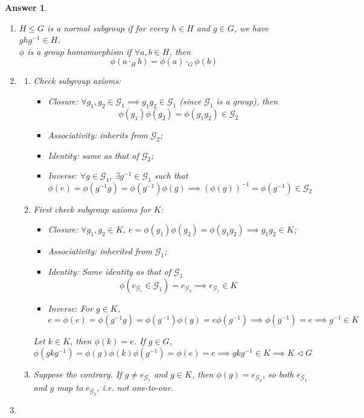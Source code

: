 \documentclass[a4paper]{article}
\newtheorem{ans}{Answer}[section]
\theoremstyle{new}
\begin{document}
\begin{ans}\leavevmode
\begin{enumerate}[label=(\roman*)]
\item $H\leq G$ is a normal subgroup if for every $h\in H$ and $g\in G$, we have $ghg^{-1}\in H$.\\[5pt]
$\phi$ is a group homomorphism if $\forall a,b\in H$, then
$$\phi(a\cdot_H b)=\phi(a)\cdot_G\phi(b)$$
\item 
\begin{enumerate}[label=(\alph*)]
\item Check subgroup axioms:
\begin{itemize}
    \item Closure: $\forall g_1,g_2\in \mathcal{G}_1\implies g_1g_2\in\mathcal{G}_1$ (since $\mathcal{G}_1$ is a group), then $$\phi(g_1)\phi(g_2)=\phi(g_1g_2)\in \mathcal{G}_2$$
    \item Associativity: inherits from $\mathcal{G}_2$;
    \item Identity: same as that of $\mathcal{G}_2$;
    \item Inverse: $\forall g\in\mathcal{G}_1$, $\exists g^{-1}\in\mathcal{G}_1$ such that
    $$\phi(e)=\phi(g^{-1}g)=\phi(g^{-1})\phi(g)\implies(\phi(g))^{-1}=\phi(g^{-1})\in\mathcal{G}_2$$
\end{itemize}
\item First check subgroup axioms for $K$:
\begin{itemize}
    \item Closure: $\forall g_1,g_2\in K$, $e=\phi(g_1)\phi(g_2)=\phi(g_1g_2)\implies g_1g_2\in K$;
    \item Associativity: inherited from $\mathcal{G}_1$;
    \item Identity: Same identity as that of $\mathcal{G}_1$ $$\phi(e_{\mathcal{G}_1}\in\mathcal{G}_1)=e_{\mathcal{G}_2}\implies e_{\mathcal{G}_1}\in K$$
    \item Inverse: For $g\in K$,
    $$e=\phi(e)=\phi(g^{-1}g)=\phi(g^{-1})\phi(g)=e\phi(g^{-1})\implies\phi(g^{-1})=e\implies g^{-1}\in K$$
\end{itemize}
Let $k\in K$, then $\phi(k)=e$. If $g\in G$,
$$\phi(gkg^{-1})=\phi(g)\phi(k)\phi(g^{-1})=\phi(e)=e\implies gkg^{-1}\in K\implies K\lhd G$$
\item Suppose the contrary. If $g\neq e_{\mathcal{G}_1}$ and $g\in K$, then $\phi(g)=e_{\mathcal{G}_2}$, so both $e_{\mathcal{G}_1}$ and $g$ map to $e_{\mathcal{G}_2}$, i.e. not one-to-one.
\end{enumerate}
\item 

\end{enumerate}
\end{ans}
\end{document}
